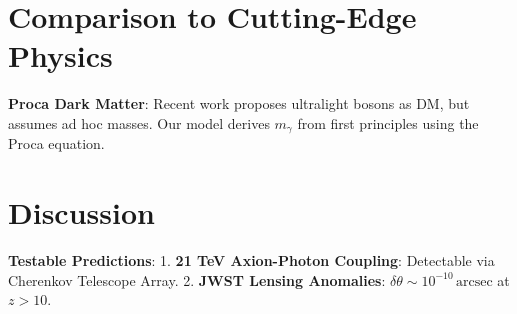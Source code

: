 \documentclass[12pt, a4paper]{article}
\begin{document}
\section{Comparison to Cutting-Edge Physics}
\label{sec:comparison}

\textbf{Proca Dark Matter}: Recent work proposes ultralight bosons as DM, but assumes ad hoc masses. Our model derives \( m_\gamma \) from first principles using the Proca equation.

\section{Discussion}
\label{sec:discussion}

\textbf{Testable Predictions}:
1. \textbf{21 TeV Axion-Photon Coupling}: Detectable via Cherenkov Telescope Array.
2. \textbf{JWST Lensing Anomalies}: \( \delta \theta \sim 10^{-10} \, \text{arcsec} \) at \( z > 10 \).



\end{document}

